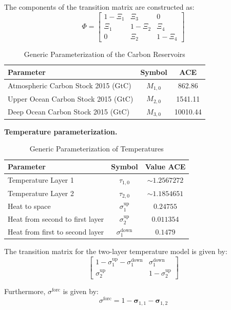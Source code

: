 The components of the transition matrix are constructed as:
\begin{equation}
    \Phi = 
    \begin{bmatrix}
        1 - \Xi_1 & \Xi_3       & 0 \\
        \Xi_1     & 1 - \Xi_2   & \Xi_4 \\
        0         & \Xi_2       & 1 - \Xi_4
    \end{bmatrix}
\end{equation}


\begin{table}[ht]
\centering
\begin{tabular}{lcc}
    \toprule
    Parameter & Symbol & ACE \\
    \midrule
    Atmospheric Carbon Stock 2015 (GtC) & \(M_{1,0}\) & 862.86 \\
    Upper Ocean Carbon Stock 2015 (GtC) & \(M_{2,0}\) & 1541.11 \\
    Deep Ocean Carbon Stock 2015 (GtC) & \(M_{3,0}\) & 10010.44 \\
    \bottomrule
\end{tabular}
\caption{Generic Parameterization of the Carbon Reservoirs}
\label{table:carbon_stock_parameters}
\end{table}


\textbf{Temperature parameterization.}

\begin{table}[ht]
\centering
\begin{tabular}{lcc}
    \toprule
    Parameter & Symbol & Value ACE \\
    \midrule
    Temperature Layer 1 & \(\tau_{1,0}\) & $\sim 1.2567272$ \\
    Temperature Layer 2 & \(\tau_{2,0}\) & $\sim 1.1854651$ \\
    Heat to space & \(\sigma^\text{up}_1\) & $0.24755$ \\
    Heat from second to first layer & \(\sigma^\text{up}_2\) & $0.011354$ \\
    Heat from first to second layer & \(\sigma^\text{down}_1\) & $0.1479$ \\
    \bottomrule
\end{tabular}
\caption{Generic Parameterization of Temperatures}
\label{table:temperature_parameters}
\end{table}

The transition matrix for the two-layer temperature model is given by:
\begin{equation}
    \begin{bmatrix}
        1-\sigma^\text{up}_1-\sigma^\text{down}_1 & \sigma^\text{down}_1 \\
        \sigma^\text{up}_2 & 1 - \sigma^\text{up}_2
    \end{bmatrix}
\end{equation}

Furthermore, \(\sigma^\text{forc}\) is given by:
\begin{equation}
    \sigma^\text{forc} = 1-\bm{\sigma}_{1,1} - \bm{\sigma}_{1,2}
\end{equation}